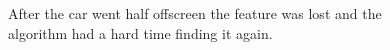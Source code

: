 \begin{figure}
\begin{minipage}[t]{0.32\linewidth}
		\caption{After the car went half offscreen the feature was lost and the algorithm had a hard time finding it again.}
		\label{fig:11_3}
	\end{minipage}
\end{figure}